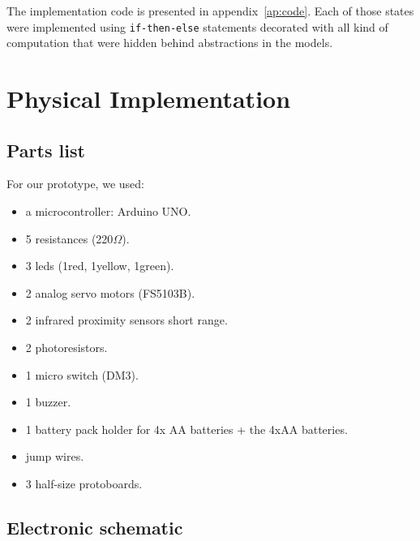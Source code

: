 The implementation code is presented in appendix~\ref{ap:code}. Each of those states were implemented using \texttt{if-then-else} statements decorated with all kind of computation that were hidden behind abstractions in the models.

\section{Physical Implementation}
\subsection{Parts list}
For our prototype, we used:
\begin{itemize}
	\item a microcontroller: Arduino UNO.
	\item 5 resistances (220$\Omega$).
    \item 3 leds (1red, 1yellow, 1green).
    \item 2 analog servo motors (FS5103B).
    \item 2 infrared proximity sensors short range.
    \item 2 photoresistors.
    \item 1 micro switch (DM3).
    \item 1 buzzer.
    \item 1 battery pack holder for 4x AA batteries + the 4xAA batteries.
    \item jump wires.
    \item 3 half-size protoboards.
\end{itemize}

\subsection{Electronic schematic}

